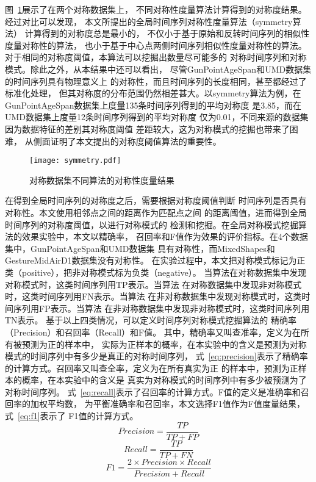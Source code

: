 图~\ref{fig:symmetry_compare}展示了在两个对称数据集上，
不同对称性度量算法计算得到的对称度结果。经过对比可以发现，
本文所提出的全局时间序列对称性度量算法（symmetry算法）
计算得到的对称度总是最小的，
不仅小于基于原始和反转时间序列的相似性度量对称性的算法，
也小于基于中心点两侧时间序列相似性度量对称性的算法。
对于相同的对称度阈值，本算法可以挖掘出数量尽可能多的
对称时间序列和对称模式。除此之外，从本结果中还可以看出，
尽管GunPointAgeSpan和UMD数据集的时间序列具有物理意义上
的对称性，而且时间序列的长度相同，甚至都经过了标准化处理，
但其对称度的分布范围仍然相差甚大。以symmetry算法为例，在
GunPointAgeSpan数据集上度量135条时间序列得到的平均对称度
是3.85，而在UMD数据集上度量12条时间序列得到的平均对称度
仅为0.01，不同来源的数据集因为数据特征的差别其对称度阈值
差距较大，这为对称模式的挖掘也带来了困难，
从侧面证明了本文提出的对称度阈值算法的重要性。
\begin{figure}
  \centering
  \texttt{[image: symmetry.pdf]}
  \caption{对称数据集不同算法的对称性度量结果}
  \label{fig:symmetry_compare}
\end{figure}

在得到全局时间序列的对称度之后，需要根据对称度阈值判断
时间序列是否具有对称性。本文使用相邻点之间的距离作为匹配点之间
的距离阈值，进而得到全局时间序列的对称度阈值，以进行对称模式的
检测和挖掘。在全局对称模式挖掘算法的效果实验中，本文以精确率，
召回率和F值作为效果的评价指标。在4个数据集中，GunPointAgeSpan和UMD数据集
具有对称性，而MixedShapes和GestureMidAirD1数据集没有对称性。
在实验过程中，本文把对称模式标记为正类（positive），把非对称模式标为负类（negative）。
当算法在对称数据集中发现对称模式时，这类时间序列用TP表示。当算法
在对称数据集中发现非对称模式时，这类时间序列用FN表示。当算法
在非对称数据集中发现对称模式时，这类时间序列用FP表示。当算法
在非对称数据集中发现非对称模式时，这类时间序列用TN表示。
基于以上四类情况，可以定义时间序列对称模式挖掘算法的
精确率（Precision）和召回率（Recall）和F值。
其中，精确率又叫查准率，定义为在所有被预测为正的样本中，
实际为正样本的概率，在本实验中的含义是预测为对称模式的时间序列中有多少是真正的对称时间序列，
式~\ref{eq:precision}表示了精确率的计算方式。召回率又叫查全率，定义为在所有真实为正
的样本中，预测为正样本的概率，在本实验中的含义是
真实为对称模式的时间序列中有多少被预测为了对称时间序列。
式~\ref{eq:recall}表示了召回率的计算方式。F值的定义是准确率和召回率的加权平均数，
为平衡准确率和召回率，本文选择F1值作为F值度量结果，式~\ref{eq:f1}表示了
F1值的计算方式。
\begin{equation}
  Precision=\frac{TP}{TP+FP}
  \label{eq:precision}
\end{equation}
\begin{equation}
  Recall=\frac{TP}{TP+FN}
  \label{eq:recall}
\end{equation}
\begin{equation}
  F1=\frac{2 \times Precision \times Recall}{Precision+Recall}
  \label{eq:f1}
\end{equation}


